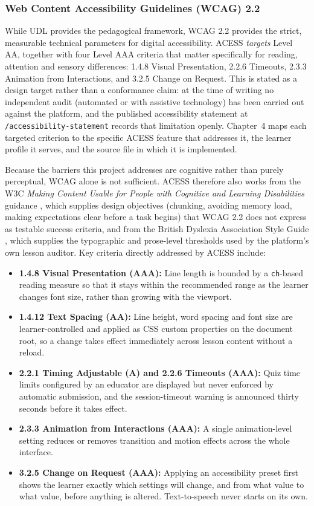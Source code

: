 \documentclass[12pt, oneside]{article} %
\begin{document}
\subsubsection{Web Content Accessibility Guidelines (WCAG) 2.2}
\label{sec:wcag}
While UDL provides the pedagogical framework, WCAG 2.2 \cite{wcag22} provides the strict, measurable technical parameters for digital accessibility. ACESS \emph{targets} Level AA, together with four Level AAA criteria that matter specifically for reading, attention and sensory differences: 1.4.8 Visual Presentation, 2.2.6 Timeouts, 2.3.3 Animation from Interactions, and 3.2.5 Change on Request. This is stated as a design target rather than a conformance claim: at the time of writing no independent audit (automated or with assistive technology) has been carried out against the platform, and the published accessibility statement at \texttt{/accessibility-statement} records that limitation openly. Chapter~4 maps each targeted criterion to the specific ACESS feature that addresses it, the learner profile it serves, and the source file in which it is implemented.

Because the barriers this project addresses are cognitive rather than purely perceptual, WCAG alone is not sufficient. ACESS therefore also works from the W3C \emph{Making Content Usable for People with Cognitive and Learning Disabilities} guidance \cite{wcag_cognitive}, which supplies design objectives (chunking, avoiding memory load, making expectations clear before a task begins) that WCAG 2.2 does not express as testable success criteria, and from the British Dyslexia Association Style Guide \cite{bda_style_guide}, which supplies the typographic and prose-level thresholds used by the platform's own lesson auditor. Key criteria directly addressed by ACESS include:
\begin{itemize}
    \item \textbf{1.4.8 Visual Presentation (AAA):} Line length is bounded by a \texttt{ch}-based reading measure so that it stays within the recommended range as the learner changes font size, rather than growing with the viewport.
    \item \textbf{1.4.12 Text Spacing (AA):} Line height, word spacing and font size are learner-controlled and applied as CSS custom properties on the document root, so a change takes effect immediately across lesson content without a reload.
    \item \textbf{2.2.1 Timing Adjustable (A) and 2.2.6 Timeouts (AAA):} Quiz time limits configured by an educator are displayed but never enforced by automatic submission, and the session-timeout warning is announced thirty seconds before it takes effect.
    \item \textbf{2.3.3 Animation from Interactions (AAA):} A single animation-level setting reduces or removes transition and motion effects across the whole interface.
    \item \textbf{3.2.5 Change on Request (AAA):} Applying an accessibility preset first shows the learner exactly which settings will change, and from what value to what value, before anything is altered. Text-to-speech never starts on its own.
\end{itemize}
\end{document}
